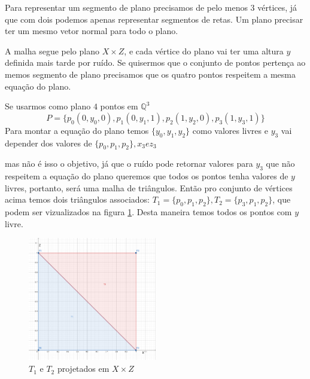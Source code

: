 Para representar um segmento de plano precisamos de pelo menos $3$ vértices, 
já que com dois podemos apenas representar segmentos de retas. Um plano precisar
ter um mesmo vetor normal para todo o plano.

A malha segue pelo plano $X \times Z$, e cada vértice do plano vai ter uma altura
$y$ definida mais tarde por ruído. Se quisermos que o conjunto de pontos pertença
ao memos segmento de plano precisamos que os quatro pontos respeitem a mesma
equação do plano.%

Se usarmos como plano $4$ pontos em $\mathbb{Q}^3$
\begin{equation}\label{comp_sign_inter_sem_peso_aux}
    P = \{p_{0}(0, y_{0}, 0), p_{1}(0, y_{1}, 1), p_{2}(1, y_{2}, 0), p_{3}(1, y_{3}, 1)\}
\end{equation}
Para montar a equação do plano temos $\{y_{0}, y_{1}, y_{2}\}$ como valores livres e $y_{3}$
vai depender dos valores de $\{p_{0}, p_{1}, p_{2}\}, x_{3} e z_{3}$


mas não é isso o objetivo, já que o ruído pode retornar valores para $y_{3}$
que não respeitem a equação do plano queremos que todos os pontos tenha valores de $y$
livres, portanto, será uma malha de triângulos. Então pro conjunto de vértices
acima temos dois triângulos associados:
$T_{1} = \{p_{0}, p_{1}, p_{2}\}, T_{2} = \{p_{3}, p_{1}, p_{2}\}$, que podem ser
vizualizados na figura \ref{fig:t1t2}. 
Desta maneira temos todos os pontos com $y$ livre.

\begin{figure}[H]
    \centering
    \includegraphics[width=0.5\textwidth]{figuras/t1t2.png}
    \caption{$T_{1}$ e $T_{2}$ projetados em $X \times Z$}
    \label{fig:t1t2}
\end{figure}



